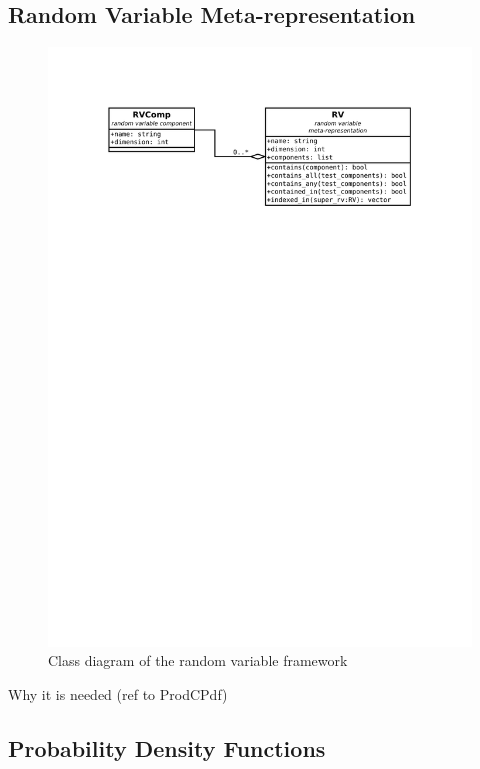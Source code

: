 \subsection{Random Variable Meta-representation}

\begin{figure}[h]
	\centering
	\includegraphics[width=\textwidth,keepaspectratio=true,clip=true,trim=3cm 218mm 3cm 3cm]{./diagrams/rvs.pdf}
	\vspace{-8mm}
	\caption{Class diagram of the random variable framework}
\end{figure}

Why it is needed (ref to ProdCPdf)

\subsection{Probability Density Functions}

